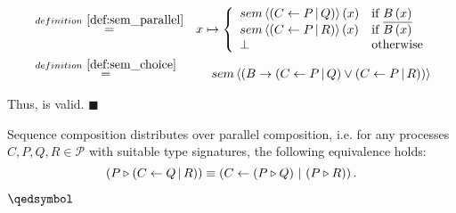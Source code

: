 \begin{myproof}
\begin{eqnarray*}
  & \overset{\defref{def:sem_parallel}}{=} & x \mapsto \left\{\begin{array}{ll}
                                                      \sem{\parallel{C}{P}{Q}} \left( x \right) & \text{if } B \left( x \right) \\
                                                      \sem{\parallel{C}{P}{R}} \left( x \right) & \text{if } \overline{B \left( x \right)} \\
                                                      \bot & \text{otherwise}
                                                    \end{array}
                                             \right. \\
  & \overset{\defref{def:sem_choice}}{=}   & \sem{\choice{B}{\parallel{C}{P}{Q}}{\parallel{C}{P}{R}}}
\end{eqnarray*}

\vspace*{-1em}
Thus,  is valid. \hfill$\blacksquare$
\end{myproof}


\begin{theorem}
\label{thm:distributivity_sequence_parallel}
Sequence composition distributes over parallel composition, i.e. for any processes $C, P, Q, R \in \mathcal{P}$ with suitable type signatures, the following equivalence holds:
\begin{equation*}
  \left( P \triangleright \left( C \gets Q \, | \, R \right) \right) \equiv \left( C \gets \left( P \triangleright Q \right) \, | \, \left( P \triangleright R \right) \right).
\end{equation*}

\vspace*{-1em}
\hfill$\qedsymbol$
\end{theorem}


